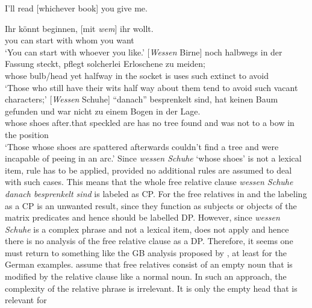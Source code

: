 \ea
I'll read [whichever book] you give me.
\z

\eal
 \ex 
\gll Ihr könnt beginnen, [mit  \emph{wem}] ihr wollt.\footnotemark\\
     you can    start    \hspaceThis{[}with whom you want\\
\glt `You can start with whoever you like.'
\ex 
\gll {}[\emph{Wessen}      Birne]    noch halbwegs in der Fassung steckt, pflegt solcherlei Erloschene zu meiden;\footnotemark\\
       \hspaceThis{[}whose bulb/head yet  halfway  in the socket  is      uses  such       extinct    to avoid\\
\glt `Those who still have their wits half way about them tend to avoid such vacant characters;'
\ex 
\gll {}[\emph{Wessen} Schuhe] "`danach"'  besprenkelt sind, hat keinen Baum gefunden und war nicht zu einem Bogen in der Lage.\footnotemark\\
       \hspaceThis{[}whose    shoes   after.that speckled    are   has no     tree found    and was not   to a     bow   in the position\\
\glt `Those whose shoes are spattered afterwards couldn't find a tree and were incapable of peeing in an arc.'
\zl
%
Since \emph{wessen Schuhe} `whose shoes' is not a lexical item, rule  has to be
applied, provided no additional rules are assumed to deal with such cases. This means that the whole
free relative clause \emph{wessen Schuhe danach besprenkelt sind} is labeled as CP. For the free
relatives in  and  the labeling as a CP is an unwanted result, since they
function as subjects or objects of the matrix predicates and hence should be labelled DP. However,
since \emph{wessen Schuhe} is a complex phrase and not a lexical item,  does not apply
and hence there is no analysis of the free relative clause as a DP. Therefore, it seems one must return to something like the GB analysis proposed by \citet{GR81a}, at least for the German
examples. \citeauthor{GR81a} assume that free relatives consist of an empty noun that is
modified by the relative clause like a normal noun. In such an approach, the complexity of the relative phrase is irrelevant. It is only the empty head that is relevant for
